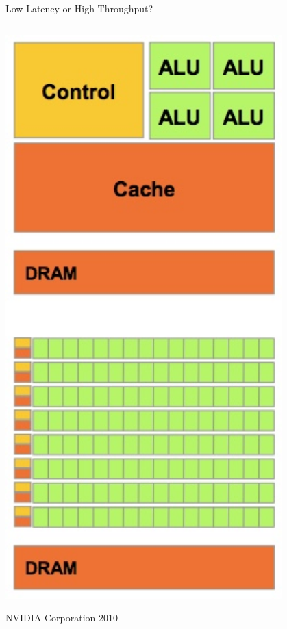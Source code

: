 \documentclass[aspectratio=43]{beamer}
\begin{document}
\begin{frame}[fragile]{Low Latency or High Throughput?}
\begin{columns}[T]
        \begin{column}{0.4\textwidth}
            \vspace{-0.2cm}
            \includegraphics[width=0.8\textwidth]{./images/layout.jpg}

            \footnotesize \textcopyright NVIDIA Corporation 2010
        \end{column}
    \end{columns}
\end{frame}
\end{document}
